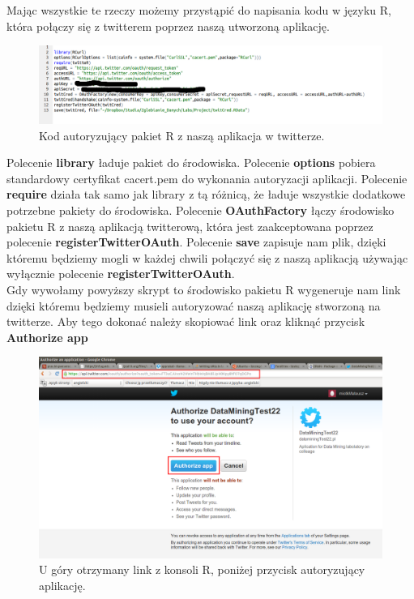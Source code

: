 \documentclass[12pt,a4paper]{report}
\begin{document}
Mając wszystkie te rzeczy możemy przystąpić do napisania kodu w języku R, która połączy się z twitterem poprzez naszą utworzoną aplikację.

\begin{figure}[H]
\includegraphics[scale=0.45]{pictures/Code1.png}
\caption{Kod autoryzujący pakiet R z naszą aplikacja w twitterze.}
\end{figure}

Polecenie \textbf{library} ładuje pakiet do środowiska. Polecenie \textbf{options} pobiera standardowy certyfikat cacert.pem do wykonania autoryzacji aplikacji. Polecenie \textbf{require} działa tak samo jak library z tą różnicą, że ładuje wszystkie dodatkowe potrzebne pakiety do środowiska. Polecenie \textbf{OAuthFactory} łączy środowisko pakietu R z naszą aplikacją twitterową, która jest zaakceptowana poprzez polecenie \textbf{registerTwitterOAuth}. Polecenie \textbf{save} zapisuje nam plik, dzięki któremu będziemy mogli w każdej chwili połączyć się z naszą aplikacją używając wyłącznie polecenie \textbf{registerTwitterOAuth}. \\
Gdy wywołamy powyższy skrypt to środowisko pakietu R wygeneruje nam link dzięki któremu będziemy musieli autoryzować naszą aplikację stworzoną na twitterze. Aby tego dokonać należy skopiować link oraz kliknąć przycisk \textbf{Authorize app}
\begin{figure}[H]
\begin{center}
\includegraphics[scale=0.25]{pictures/Twitter5.png}
\caption{U góry otrzymany link z konsoli R, poniżej przycisk autoryzujący aplikację.}
\end{center}
\end{figure}
\end{document}
